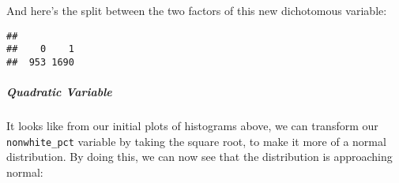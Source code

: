 \documentclass[
]{article}
\newenvironment{Shaded}{\begin{snugshade}}{\end{snugshade}}
\newcommand{\ControlFlowTok}[1]{\textcolor[rgb]{0.13,0.29,0.53}{\textbf{#1}}}
\newcommand{\DecValTok}[1]{\textcolor[rgb]{0.00,0.00,0.81}{#1}}
\newcommand{\KeywordTok}[1]{\textcolor[rgb]{0.13,0.29,0.53}{\textbf{#1}}}
\newcommand{\NormalTok}[1]{#1}
\newcommand{\OperatorTok}[1]{\textcolor[rgb]{0.81,0.36,0.00}{\textbf{#1}}}
\newcommand{\StringTok}[1]{\textcolor[rgb]{0.31,0.60,0.02}{#1}}
\begin{document}
\begin{Shaded}
\end{Shaded}

And here's the split between the two factors of this new dichotomous
variable:

\begin{Shaded}
\end{Shaded}

\begin{verbatim}
## 
##    0    1 
##  953 1690
\end{verbatim}

\hypertarget{quadratic-variable}{%
\subparagraph{Quadratic Variable}\label{quadratic-variable}}

It looks like from our initial plots of histograms above, we can
transform our \texttt{nonwhite\_pct} variable by taking the square root,
to make it more of a normal distribution. By doing this, we can now see
that the distribution is approaching normal:
\end{document}
